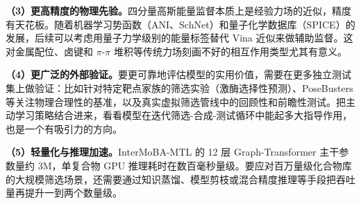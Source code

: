 \textbf{（3）更高精度的物理先验。}四分量高斯能量监督本质上是经验力场的近似，精度有天花板。随着机器学习势函数（ANI\cite{smith2017ani}、SchNet\cite{schutt2018schnet}）和量子化学数据库（SPICE\cite{eastman2023spice}）的发展，后续可以考虑用量子力学级别的能量标签替代 Vina 近似来做辅助监督。这对金属配位、卤键和 $\pi$-$\pi$ 堆积等传统力场刻画不好的相互作用类型尤其有意义。

\textbf{（4）更广泛的外部验证。}要更可靠地评估模型的实用价值，需要在更多独立测试集上做验证：比如针对特定靶点家族的筛选实验（激酶选择性预测）、PoseBusters 等关注物理合理性的基准\cite{buttenschoen2024posebusters}，以及真实虚拟筛选管线中的回顾性和前瞻性测试。把主动学习策略结合进来，看看模型在迭代筛选-合成-测试循环中能起多大指导作用，也是一个有吸引力的方向。

\textbf{（5）轻量化与推理加速。}InterMoBA-MTL 的 12 层 Graph-Transformer 主干参数量约 3M，单复合物 GPU 推理耗时在数百毫秒量级。要应对百万量级化合物库的大规模筛选场景，还需要通过知识蒸馏、模型剪枝或混合精度推理等手段把吞吐量再提升一到两个数量级。

\newpage
